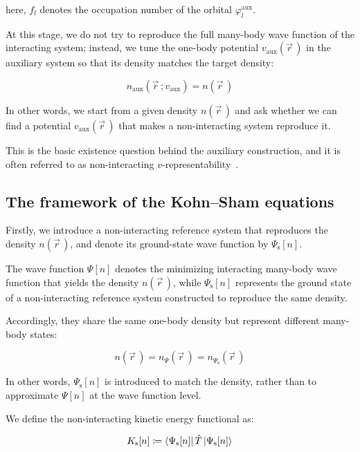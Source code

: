 here, $f_l$ denotes the occupation number of the orbital $\varphi^\mathrm{aux}_l$.

At this stage, we do not try to reproduce the full many-body wave function of the interacting system;
instead, we tune the one-body potential $v_\mathrm{aux}(\vec{r}\,)$ in the auxiliary system so that its density matches the target density:

\begin{equation}
    n_\mathrm{aux}(\vec{r}\,;v_\mathrm{aux}) = n(\vec{r}\,)
\label{auxiliary_density_matching_condition_with_potential}
\end{equation}
 
In other words, we start from a given density $n(\vec{r}\,)$ and ask whether we can find a potential $v_\mathrm{aux}(\vec{r}\,)$ that makes a non-interacting system reproduce it.

This is the basic existence question behind the auxiliary construction,
and it is often referred to as non-interacting $v$-representability~\cite{de2012pure}.

\subsection{The framework of the Kohn--Sham equations}

Firstly, we introduce a non-interacting reference system that reproduces the density $n(\vec{r}\,)$, and denote its ground-state wave function by $\Psi_\mathrm{s}[n]$.

The wave function $\Psi[n]$ denotes the minimizing interacting many-body wave function that yields the density $n(\vec{r}\,)$,
while $\Psi_\mathrm{s}[n]$ represents the ground state of a non-interacting reference system constructed to reproduce the same density.

Accordingly, they share the same one-body density but represent different many-body states:

\begin{equation}
n(\vec{r}\,) = n_{\Psi}(\vec{r}\,) = n_{\Psi_\mathrm{s}}(\vec{r}\,)
\label{density_equal_Psi_Psis}
\end{equation}

In other words, $\Psi_\mathrm{s}[n]$ is introduced to match the density, rather than to approximate $\Psi[n]$ at the wave function level.

We define the non-interacting kinetic energy functional as:

\begin{equation}
    K_\mathrm{s}[n]\coloneqq\bra{\Psi_\mathrm{s}[n]}\hat{T}\ket{\Psi_\mathrm{s}[n]}
\label{Ts_definition}
\end{equation}

